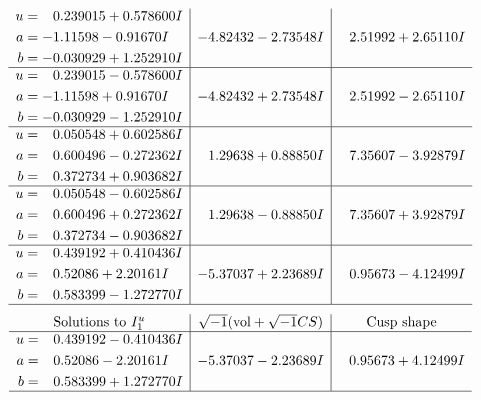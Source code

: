 \documentclass[1p]{elsarticle_modified}
\theoremstyle{definition}
\newcommand{\I}{\sqrt{-1}}
\begin{document}
$$\begin{array}{c|c|c}
\begin{aligned}
u &= \phantom{-}0.239015 + 0.578600 I \\
a &= -1.11598 - 0.91670 I \\
b &= -0.030929 + 1.252910 I\end{aligned}
 & -4.82432 - 2.73548 I & \phantom{-}2.51992 + 2.65110 I \\ \hline\begin{aligned}
u &= \phantom{-}0.239015 - 0.578600 I \\
a &= -1.11598 + 0.91670 I \\
b &= -0.030929 - 1.252910 I\end{aligned}
 & -4.82432 + 2.73548 I & \phantom{-}2.51992 - 2.65110 I \\ \hline\begin{aligned}
u &= \phantom{-}0.050548 + 0.602586 I \\
a &= \phantom{-}0.600496 - 0.272362 I \\
b &= \phantom{-}0.372734 + 0.903682 I\end{aligned}
 & \phantom{-}1.29638 + 0.88850 I & \phantom{-}7.35607 - 3.92879 I \\ \hline\begin{aligned}
u &= \phantom{-}0.050548 - 0.602586 I \\
a &= \phantom{-}0.600496 + 0.272362 I \\
b &= \phantom{-}0.372734 - 0.903682 I\end{aligned}
 & \phantom{-}1.29638 - 0.88850 I & \phantom{-}7.35607 + 3.92879 I \\ \hline\begin{aligned}
u &= \phantom{-}0.439192 + 0.410436 I \\
a &= \phantom{-}0.52086 + 2.20161 I \\
b &= \phantom{-}0.583399 - 1.272770 I\end{aligned}
 & -5.37037 + 2.23689 I & \phantom{-}0.95673 - 4.12499 I\\
 \hline 
 \end{array}$$\newpage$$\begin{array}{c|c|c}  
\text{Solutions to }I^u_{1}& \I (\text{vol} + \sqrt{-1}CS) & \text{Cusp shape}\\
 \hline 
\begin{aligned}
u &= \phantom{-}0.439192 - 0.410436 I \\
a &= \phantom{-}0.52086 - 2.20161 I \\
b &= \phantom{-}0.583399 + 1.272770 I\end{aligned}
 & -5.37037 - 2.23689 I & \phantom{-}0.95673 + 4.12499 I\\
 \hline 
 \end{array}$$\newpage\newpage\renewcommand{\arraystretch}{1}
\end{document}
